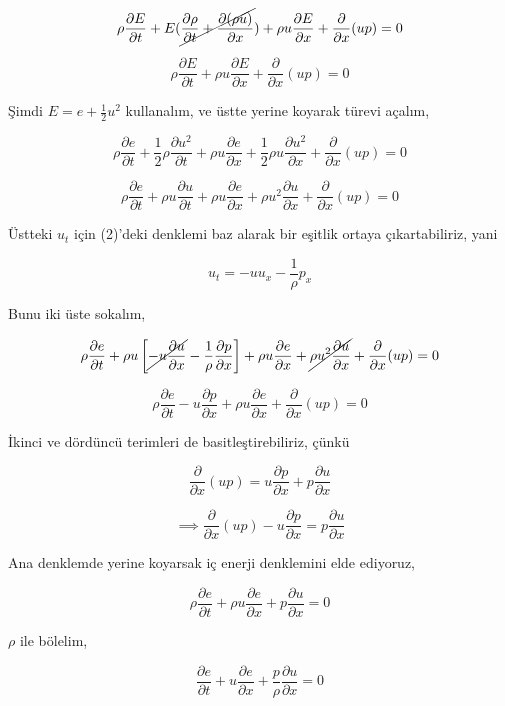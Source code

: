 \documentclass[12pt,fleqn]{article}\usepackage{../../common}
\begin{document}
$$
\rho \frac{\partial E}{\partial t} +
E ( \cancel{\frac{\partial \rho}{\partial t} + \frac{\partial (\rho u)}{\partial x}}) +
\rho u \frac{\partial E}{\partial x} +
\frac{\partial }{\partial x} (up) = 0
$$

$$
\rho \frac{\partial E}{\partial t} +
\rho u \frac{\partial E}{\partial x} +
\frac{\partial }{\partial x} (up) = 0
$$

Şimdi $E = e + \frac{1}{2} u^2$ kullanalım, ve üstte yerine koyarak türevi
açalım,

$$
\rho \frac{\partial e}{\partial t} + \frac{1}{2} \rho \frac{\partial u^2}{\partial t}+
\rho u \frac{\partial e}{\partial x} + \frac{1}{2} \rho u \frac{\partial u^2}{\partial x}+
\frac{\partial }{\partial x} (up) = 0
$$

$$
\rho \frac{\partial e}{\partial t} +
\rho u \frac{\partial u}{\partial t} +
\rho u \frac{\partial e}{\partial x} +
\rho u^2 \frac{\partial u}{\partial x} +
\frac{\partial }{\partial x}(up) = 0
$$

Üstteki $u_t$ için (2)'deki denklemi baz alarak bir eşitlik ortaya
çıkartabiliriz, yani

$$
u_t = -u u_x - \frac{1}{\rho} p_x
$$

Bunu iki üste sokalım,

$$
\rho \frac{\partial e}{\partial t} +
\rho u \left[
  \cancel{-u \frac{\partial u}{\partial x}} - \frac{1}{\rho} \frac{\partial p}{\partial x}
\right] +
\rho u \frac{\partial e}{\partial x} +
\cancel{\rho u^2 \frac{\partial u}{\partial x}} +
\frac{\partial }{\partial x} (up) = 0
$$

$$
\rho \frac{\partial e}{\partial t} -
u \frac{\partial p}{\partial x} +
\rho u \frac{\partial e}{\partial x} +
\frac{\partial }{\partial x} (up) = 0
$$

İkinci ve dördüncü terimleri de basitleştirebiliriz, çünkü

$$
\frac{\partial }{\partial x} (up) =
u\frac{\partial p}{\partial x} + 
p\frac{\partial u}{\partial x}  
$$

$$
\implies
\frac{\partial }{\partial x} (up) - u\frac{\partial p}{\partial x} =
p\frac{\partial u}{\partial x}
$$

Ana denklemde yerine koyarsak iç enerji denklemini elde ediyoruz,

$$
\rho \frac{\partial e}{\partial t} +
\rho u \frac{\partial e}{\partial x} +
p \frac{\partial u}{\partial x} = 0
$$

$\rho$ ile bölelim,

$$
\frac{\partial e}{\partial t} +
u \frac{\partial e}{\partial x} +
\frac{p}{\rho} \frac{\partial u}{\partial x} = 0
$$
\end{document}
